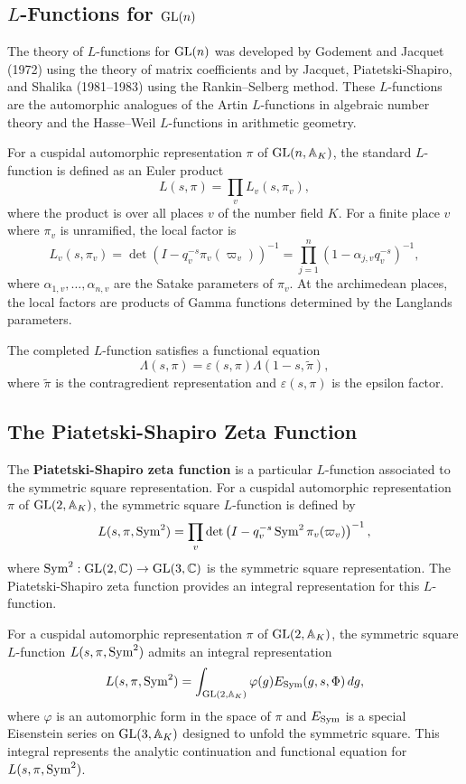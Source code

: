 \subsection{\texorpdfstring{\(L\)}{L}-Functions for \texorpdfstring{\(\operatorname{GL}(n)\)}{GL(n)}}

The theory of \(L\)-functions for \(\operatorname{GL}(n)\) was developed by Godement and Jacquet (1972) using the theory of matrix coefficients and by Jacquet, Piatetski-Shapiro, and Shalika (1981--1983) using the Rankin--Selberg method. These \(L\)-functions are the automorphic analogues of the Artin \(L\)-functions in algebraic number theory and the Hasse--Weil \(L\)-functions in arithmetic geometry.

For a cuspidal automorphic representation \(\pi\) of \(\operatorname{GL}(n,\mathbb{A}_K)\), the standard \(L\)-function is defined as an Euler product
\[
L(s, \pi) = \prod_v L_v(s, \pi_v),
\]
where the product is over all places \(v\) of the number field \(K\). For a finite place \(v\) where \(\pi_v\) is unramified, the local factor is
\[
L_v(s, \pi_v) = \det\left( I - q_v^{-s} \pi_v(\varpi_v) \right)^{-1} = \prod_{j=1}^n \left(1 - \alpha_{j,v} q_v^{-s}\right)^{-1},
\]
where \(\alpha_{1,v}, \dots, \alpha_{n,v}\) are the Satake parameters of \(\pi_v\). At the archimedean places, the local factors are products of Gamma functions determined by the Langlands parameters.

The completed \(L\)-function satisfies a functional equation
\[
\Lambda(s, \pi) = \varepsilon(s, \pi) \Lambda(1-s, \widetilde{\pi}),
\]
where \(\widetilde{\pi}\) is the contragredient representation and \(\varepsilon(s, \pi)\) is the epsilon factor.

\subsection{The Piatetski-Shapiro Zeta Function}

The \textbf{Piatetski-Shapiro zeta function} is a particular \(L\)-function associated to the symmetric square representation. For a cuspidal automorphic representation \(\pi\) of \(\operatorname{GL}(2,\mathbb{A}_K)\), the symmetric square \(L\)-function is defined by
\[
L(s, \pi, \operatorname{Sym}^2) = \prod_v \det\left( I - q_v^{-s} \operatorname{Sym}^2 \pi_v(\varpi_v) \right)^{-1},
\]
where \(\operatorname{Sym}^2: \operatorname{GL}(2,\mathbb{C}) \to \operatorname{GL}(3,\mathbb{C})\) is the symmetric square representation. The Piatetski-Shapiro zeta function provides an integral representation for this \(L\)-function.

\begin{theorem}
For a cuspidal automorphic representation \(\pi\) of \(\operatorname{GL}(2,\mathbb{A}_K)\), the symmetric square \(L\)-function \(L(s, \pi, \operatorname{Sym}^2)\) admits an integral representation
\[
L(s, \pi, \operatorname{Sym}^2) = \int_{\operatorname{GL}(2,\mathbb{A}_K)} \varphi(g) E_{\operatorname{Sym}}(g, s, \Phi)\, dg,
\]
where \(\varphi\) is an automorphic form in the space of \(\pi\) and \(E_{\operatorname{Sym}}\) is a special Eisenstein series on \(\operatorname{GL}(3,\mathbb{A}_K)\) designed to unfold the symmetric square. This integral represents the analytic continuation and functional equation for \(L(s, \pi, \operatorname{Sym}^2)\).
\end{theorem}

